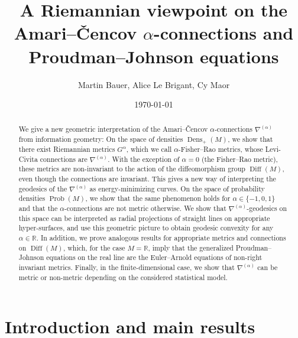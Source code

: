 \documentclass[11pt,reqno]{amsart}
\title[Amari--\v{C}encov $\alpha$-connections and Proudman--Johnson equations]{A Riemannian viewpoint on the Amari--\v{C}encov $\alpha$-connections and Proudman--Johnson equations}
\author[]
{Martin Bauer, Alice Le Brigant, Cy Maor}
\date{\today}
\theoremstyle{definition}
\newcommand{\R}{\mathbb R}
\newcommand{\Prob}{\operatorname{Prob}(M)}
\newcommand{\Dens}{\operatorname{Dens}_+(M)}
\newcommand{\Diff}{\operatorname{Diff}(M)}
\begin{document}
\begin{abstract}
We give a new geometric interpretation of the Amari--\v{C}encov $\alpha$-connections $\nabla^{(\alpha)}$ from information geometry:
On the space of densities $\Dens$, we show that there exist Riemannian metrics $G^\alpha$, which we call $\alpha$-Fisher--Rao metrics, whose Levi-Civita connections are $\nabla^{(\alpha)}$.
With the exception of $\alpha=0$ (the Fisher--Rao metric), these metrics are non-invariant to the action of the diffeomorphism group $\Diff$, even though the connections are invariant. 
This gives a new way of interpreting the geodesics of the $\nabla^{(\alpha)}$ as energy-minimizing curves.
On the space of probability densities $\Prob$, we show that the same phenomenon holds for $\alpha\in \{-1,0,1\}$ and that the $\alpha$-connections are not metric otherwise. We show that $\nabla^{(\alpha)}$-geodesics on this space %
can be interpreted as radial projections of straight lines on appropriate hyper-surfaces, and use this geometric picture to obtain geodesic convexity for any $\alpha\in \R$.
In addition, we prove analogous results for appropriate metrics and connections on $\Diff$, which, for the case $M=\R$, imply that the generalized Proudman--Johnson equations on the real line are the Euler--Arnold equations of non-right invariant metrics. Finally, in the finite-dimensional case, we show that $\nabla^{(\alpha)}$ can be metric or non-metric depending on the considered statistical model. 
\end{abstract}

\maketitle
\setcounter{tocdepth}{1}
\tableofcontents


\section{Introduction and main results}
\end{document}
